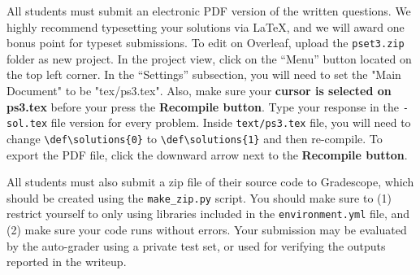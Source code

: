 
All students must submit an electronic PDF version of the written questions. We highly recommend typesetting your solutions via \LaTeX, and we will award one bonus point for typeset submissions. To edit on Overleaf, upload the \texttt{pset3.zip}  folder as new project. In the project view, click on the “Menu” button located on the top left corner. In the “Settings” subsection, you will need to set the "Main Document" to be "tex/ps3.tex". Also, make sure your \textbf{cursor is selected on ps3.tex}  before your press the \textbf{Recompile button}. Type your response in the \texttt{-sol.tex} file version for every problem. Inside \texttt{text/ps3.tex} file, you will need to change \texttt{\textbackslash def\textbackslash solutions\{0\}} to \texttt{\textbackslash def\textbackslash solutions\{1\}} and then re-compile. To export the PDF file, click the downward arrow next to the \textbf{Recompile button}.

\vspace{1mm}

All students must also submit a zip file of their source code to Gradescope, which should be created using the \texttt{make\_zip.py} script. You should make sure to (1) restrict yourself to only using libraries included in the \texttt{environment.yml} file, and (2) make sure your code runs without errors. Your submission may be evaluated by the auto-grader using a private test set, or used for verifying the outputs reported in the writeup. 


